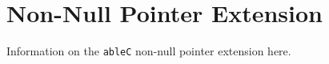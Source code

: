 \documentclass[main.tex]{subfiles}
\begin{document}
\section{Non-Null Pointer Extension}

Information on the \verb|ableC| non-null pointer extension here.
\end{document}
